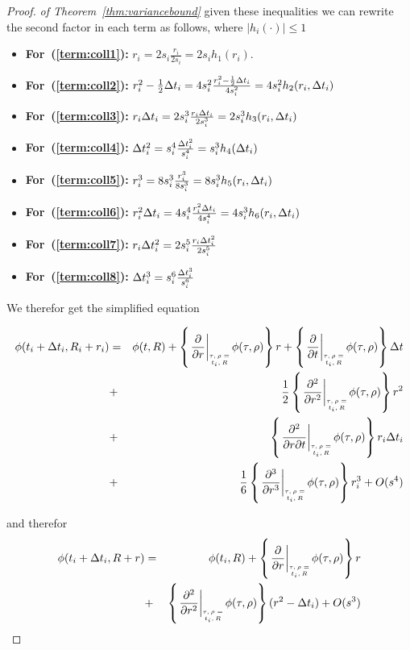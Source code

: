\documentclass[anon,12pt]{colt2024} %
\begin{document}
\begin{proof} {\em of Theorem~\ref{thm:variancebound}}
  given these inequalities we can rewrite the second factor in each
  term as follows, where $|h_i(\cdot)|\leq 1$
  \begin{itemize}
  \item {\bf For~(\ref{term:coll1}):}
    $r_i=2s_i\frac{r_i}{2s_i}=2s_ih_1(r_i)$.
  \item {\bf For~(\ref{term:coll2}):}
    $r_i^2 - \frac{1}{2}\Delta t_i = 4s_i^2\frac{r_i^2 -
      \frac{1}{2}\Delta t_i}{4s_i^2} = 4s_i^2 h_2(r_i,\Delta t_i)$
  \item {\bf For~(\ref{term:coll3}):} $r_i \Delta t_i = 2s_i^3
    \frac{r_i \Delta t_i}{2s_i^3} = 2s_i^3 h_3(r_i,\Delta t_i)$
  \item {\bf For~(\ref{term:coll4}):} $\Delta t_i^2 =
    s_i^4\frac{\Delta t_i^2}{s_i^4} = s_i^3 h_4(\Delta t_i)$
  \item {\bf For~(\ref{term:coll5}):} $r_i^3 = 8s_i^3
    \frac{r_i^3}{8s_i^3} = 8s_i^3 h_5(r_i,\Delta t_i)$
  \item {\bf For~(\ref{term:coll6}):} $r_i^2 \Delta t_i = 4s_i^4
    \frac{r_i^2 \Delta t_i}{4s_i^4} = 4s_i^3 h_6(r_i,\Delta t_i)$
  \item {\bf For~(\ref{term:coll7}):} $r_i \Delta t_i^2 = 2s_i^5
    \frac{r_i \Delta t_i^2}{2s_i^5}$
  \item {\bf For~(\ref{term:coll8}):} $\Delta t_i^3 = s_i^6 \frac{\Delta t_i^3}{s_i^6}$
\end{itemize}
  We therefor get the simplified equation
  
  \begin{eqnarray*} 
     \pot(t_i+\deltat_i,\R_i+r_i) & =&  \pot(t,\R)+\at{\frac{\partial}{\partial r}} r
    + \at{\frac{\partial}{\partial t}} \deltat \\
                                  &+& 
                                      \frac{1}{2}  \at{\frac{\partial^2}{\partial r^2}} r^2\\
                                  &+& \at{\frac{\partial^2}{\partial r \partial t}} r_i \deltat_i \label{term:Taylor_collected_rdt}\\
                                  &+& \frac{1}{6} \at{\frac{\partial^3}{\partial r^3}} r_i^3 \label{term:Taylor_collected_r3}
                                      + O(s^4)
\end{eqnarray*}

and therefor
  \begin{eqnarray} 
     \pot(t_i+\deltat_i,\R+r) &=& \pot(t_i,\R) +
                                  \at{\frac{\partial}{\partial r}} r
                                  \nonumber \\
    &+& \at{\frac{\partial^2}{\partial r^2}} (r^2 - \deltat_i) +
        O(s^3) \label{eqn:Taylor}
\end{eqnarray}


\end{proof}
\end{document}

